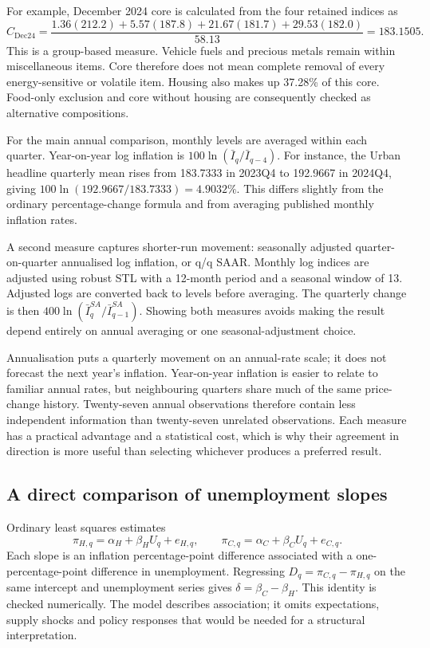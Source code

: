 \documentclass[11pt,a4paper]{article}
\begin{document}
For example, December 2024 core is calculated from the four retained indices as
\begin{equation}
C_{\mathrm{Dec24}}=
\frac{1.36(212.2)+5.57(187.8)+21.67(181.7)+29.53(182.0)}{58.13}
=183.1505.
\label{eq:core}
\end{equation}
This is a group-based measure. Vehicle fuels and precious metals remain within miscellaneous items. Core therefore does not mean complete removal of every energy-sensitive or volatile item. Housing also makes up 37.28\% of this core. Food-only exclusion and core without housing are consequently checked as alternative compositions.

For the main annual comparison, monthly levels are averaged within each quarter. Year-on-year log inflation is $100\ln(\bar I_q/\bar I_{q-4})$. For instance, the Urban headline quarterly mean rises from 183.7333 in 2023Q4 to 192.9667 in 2024Q4, giving $100\ln(192.9667/183.7333)=4.9032\%$. This differs slightly from the ordinary percentage-change formula and from averaging published monthly inflation rates.

A second measure captures shorter-run movement: seasonally adjusted quarter-on-quarter annualised log inflation, or q/q SAAR. Monthly log indices are adjusted using robust STL with a 12-month period and a seasonal window of 13. Adjusted logs are converted back to levels before averaging. The quarterly change is then $400\ln(\bar I_q^{SA}/\bar I_{q-1}^{SA})$. Showing both measures avoids making the result depend entirely on annual averaging or one seasonal-adjustment choice.

Annualisation puts a quarterly movement on an annual-rate scale; it does not forecast the next year's inflation. Year-on-year inflation is easier to relate to familiar annual rates, but neighbouring quarters share much of the same price-change history. Twenty-seven annual observations therefore contain less independent information than twenty-seven unrelated observations. Each measure has a practical advantage and a statistical cost, which is why their agreement in direction is more useful than selecting whichever produces a preferred result.

\subsection{A direct comparison of unemployment slopes}

Ordinary least squares estimates
\begin{equation}
\pi_{H,q}=\alpha_H+\beta_H U_q+e_{H,q},\qquad
\pi_{C,q}=\alpha_C+\beta_C U_q+e_{C,q}.
\label{eq:ols}
\end{equation}
Each slope is an inflation percentage-point difference associated with a one-percentage-point difference in unemployment. Regressing $D_q=\pi_{C,q}-\pi_{H,q}$ on the same intercept and unemployment series gives $\delta=\beta_C-\beta_H$. This identity is checked numerically. The model describes association; it omits expectations, supply shocks and policy responses that would be needed for a structural interpretation.
\end{document}
